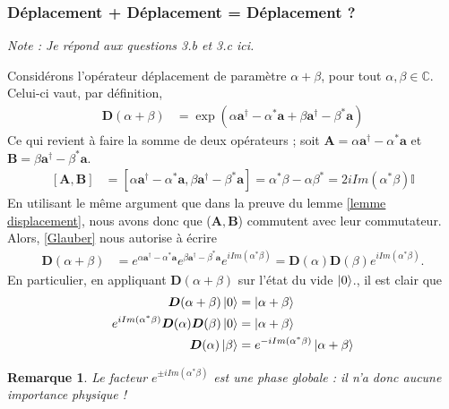 \documentclass[11pt,oneside,a4paper]{article}
\newtheorem{remark}[theorem]{Remarque}
\begin{document}
\subsubsection{Déplacement + Déplacement = Déplacement ?}
\emph{Note : Je répond aux questions 3.b et 3.c ici.}

Considérons l'opérateur déplacement de paramètre $\alpha+\beta$, pour tout $\alpha,\beta\in\mathbb{C}$. Celui-ci vaut, par définition,
\begin{align*}
  \bm{D}(\alpha+\beta) &= \exp(\alpha\bm{a}^\dagger-\alpha^*\bm{a}+\beta\bm{a}^\dagger-\beta^*\bm{a})
\end{align*}
Ce qui revient à faire la somme de deux opérateurs ; soit $\bm{A} = \alpha\bm{a}^\dagger-\alpha^*\bm{a}$ et $\bm{B} = \beta\bm{a}^\dagger-\beta^*\bm{a}$.
\begin{align*}
  \left[\bm{A},\bm{B}\right] &= \left[\alpha\bm{a}^\dagger-\alpha^*\bm{a},\beta\bm{a}^\dagger-\beta^*\bm{a}\right] = \alpha^*\beta-\alpha\beta^* = 2i Im(\alpha^*\beta)\mathbb{I}
\end{align*}
En utilisant le même argument que dans la preuve du lemme \ref{lemme displacement}, nous avons donc que ($\bm{A},\bm{B}$) commutent avec leur commutateur. Alors, \eqref{Glauber} nous autorise à écrire
\begin{align*}
  \bm{D}(\alpha+\beta) &= e^{\alpha\bm{a}^\dagger-\alpha^*\bm{a}}e^{\beta\bm{a}^\dagger-\beta^*\bm{a}}e^{iIm(\alpha^*\beta)} = \bm{D}(\alpha)\bm{D}(\beta)e^{iIm(\alpha^*\beta)}.
\end{align*}
En particulier, en appliquant $\bm{D}(\alpha+\beta)$ sur l'état du vide $\ket{0}$., il est clair que
\begin{align}
  \bm{D}(\alpha+\beta)\ket{0} &= \ket{\alpha+\beta}\notag\\
  e^{iIm(\alpha^*\beta)}\bm{D}(\alpha)\bm{D}(\beta)\ket{0} &= \ket{\alpha+\beta}\notag\\
  \bm{D}(\alpha)\ket{\beta} &= e^{-iIm(\alpha^*\beta)}\ket{\alpha+\beta}\label{eq:deplacement sur etat coherent}
\end{align}
\begin{remark}
  Le facteur $e^{\pm iIm(\alpha^*\beta)}$ est une phase globale : il n'a donc aucune importance physique ! 
\end{remark}
\end{document}
